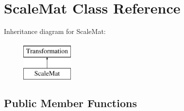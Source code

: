 \hypertarget{class_scale_mat}{\section{Scale\-Mat Class Reference}
\label{class_scale_mat}
}
Inheritance diagram for Scale\-Mat\-:\begin{figure}[H]
\begin{center}
\leavevmode
\includegraphics[height=2.000000cm]{class_scale_mat}
\end{center}
\end{figure}
\subsection*{Public Member Functions}
